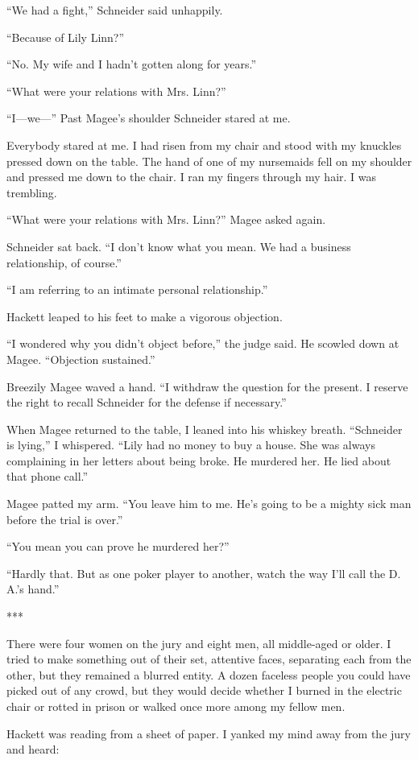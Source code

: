 \documentclass{novel}
\begin{document}
{“We had a fight,” Schneider said unhappily.

“Because of Lily Linn?”

“No. My wife and I hadn’t gotten along for years.”

“What were your relations with Mrs. Linn?”

“I—we—” Past Magee’s shoulder Schneider stared at me.

Everybody stared at me. I had risen from my chair and stood with my knuckles pressed down on the table. The hand of one of my nursemaids fell on my shoulder and pressed me down to the chair. I ran my fingers through my hair. I was trembling.

“What were your relations with Mrs. Linn?” Magee asked again.

Schneider sat back. “I don’t know what you mean. We had a business relationship, of course.”

“I am referring to an intimate personal relationship.”

Hackett leaped to his feet to make a vigorous objection.

“I wondered why you didn’t object before,” the judge said. He scowled down at Magee. “Objection sustained.”

Breezily Magee waved a hand. “I withdraw the question for the present. I reserve the right to recall Schneider for the defense if necessary.”

When Magee returned to the table, I leaned into his whiskey breath. “Schneider is lying,” I whispered. “Lily had no money to buy a house. She was always complaining in her letters about being broke. He murdered her. He lied about that phone call.”

Magee patted my arm. “You leave him to me. He’s going to be a mighty sick man before the trial is over.”

“You mean you can prove he murdered her?”

“Hardly that. But as one poker player to another, watch the way I’ll call the D. A.’s hand.”

***

There were four women on the jury and eight men, all middle-aged or older. I tried to make something out of their set, attentive faces, separating each from the other, but they remained a blurred entity. A dozen faceless people you could have picked out of any crowd, but they would decide whether I burned in the electric chair or rotted in prison or walked once more among my fellow men.

Hackett was reading from a sheet of paper. I yanked my mind away from the jury and heard:

}
\end{document}
